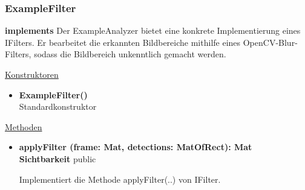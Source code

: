 \subsubsection{ExampleFilter} \label{service:klasse:ExampleFilter}
\textbf{implements}  \newline
Der ExampleAnalyzer bietet eine konkrete Implementierung eines IFilters. Er bearbeitet die erkannten Bildbereiche mithilfe eines OpenCV-Blur-Filters, sodass die Bildbereich unkenntlich gemacht werden. \newline

\underline{Konstruktoren}
\begin{itemize}
\itemsep0pt
\item \textbf{ExampleFilter()} \hfill\\
Standardkonstruktor
\end{itemize}

\underline{Methoden}
\begin{itemize}
\itemsep0pt
\item \textbf{applyFilter (frame: Mat, detections: MatOfRect): Mat}\hfill\\
\textbf{Sichtbarkeit} public

Implementiert die Methode applyFilter(..) von IFilter.

\end{itemize}